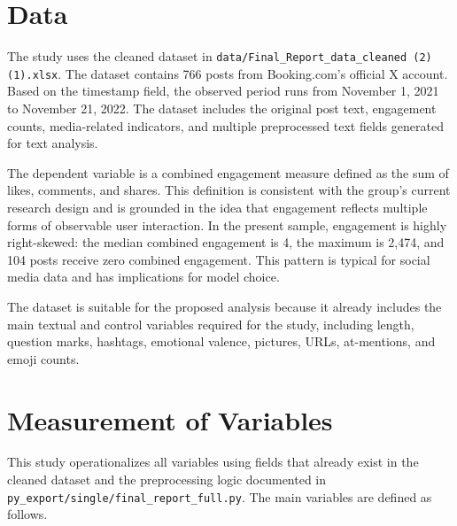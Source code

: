 \documentclass[12pt,a4paper]{ctexart}
\begin{document}
\section{Data}
The study uses the cleaned dataset in \texttt{data/Final\_Report\_data\_cleaned (2) (1).xlsx}. The dataset contains 766 posts from Booking.com's official X account. Based on the timestamp field, the observed period runs from November 1, 2021 to November 21, 2022. The dataset includes the original post text, engagement counts, media-related indicators, and multiple preprocessed text fields generated for text analysis.

The dependent variable is a combined engagement measure defined as the sum of likes, comments, and shares. This definition is consistent with the group's current research design and is grounded in the idea that engagement reflects multiple forms of observable user interaction. In the present sample, engagement is highly right-skewed: the median combined engagement is 4, the maximum is 2,474, and 104 posts receive zero combined engagement. This pattern is typical for social media data and has implications for model choice.

The dataset is suitable for the proposed analysis because it already includes the main textual and control variables required for the study, including length, question marks, hashtags, emotional valence, pictures, URLs, at-mentions, and emoji counts.

\section{Measurement of Variables}
This study operationalizes all variables using fields that already exist in the cleaned dataset and the preprocessing logic documented in \texttt{py\_export/single/final\_report\_full.py}. The main variables are defined as follows.
\end{document}
